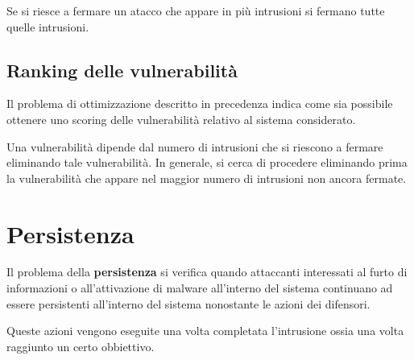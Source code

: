 Se si riesce a fermare un atacco che appare in più intrusioni si fermano tutte quelle intrusioni.

\subsection{Ranking delle vulnerabilità}
Il problema di ottimizzazione descritto in precedenza indica come sia possibile ottenere uno scoring delle
vulnerabilità relativo al sistema considerato.

Una vulnerabilità dipende dal numero di intrusioni che si riescono a fermare eliminando tale vulnerabilità. In
generale, si cerca di procedere eliminando prima la vulnerabilità che appare nel maggior numero di intrusioni non
ancora fermate.

\section{Persistenza}
Il problema della \textbf{persistenza} si verifica quando attaccanti interessati al furto di informazioni o
all'attivazione di malware all'interno del sistema continuano ad essere persistenti all'interno del sistema nonostante
le azioni dei difensori.

Queste azioni vengono eseguite una volta completata l'intrusione ossia una volta raggiunto un certo obbiettivo.